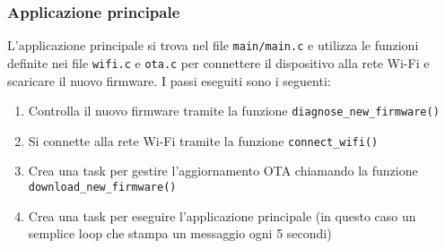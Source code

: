 \documentclass[a4paper]{article}
\begin{document}
\subsubsection{Applicazione principale}
L'applicazione principale si trova nel file \texttt{main/main.c} e utilizza le funzioni
definite nei file \texttt{wifi.c} e \texttt{ota.c} per connettere il dispositivo
alla rete Wi-Fi e scaricare il nuovo firmware. I passi eseguiti sono i seguenti:
\begin{enumerate}
  \item Controlla il nuovo firmware tramite la funzione \texttt{diagnose\_new\_firmware()}
  \item Si connette alla rete Wi-Fi tramite la funzione \texttt{connect\_wifi()}
  \item Crea una task per gestire l'aggiornamento OTA chiamando la funzione
    \texttt{download\_new\_firmware()}
  \item Crea una task per eseguire l'applicazione principale (in questo caso un semplice
    loop che stampa un messaggio ogni 5 secondi)
\end{enumerate}


\nocite{*}
\printbibliography[
heading=bibintoc,
title={Bibliografia}
]
\end{document}
